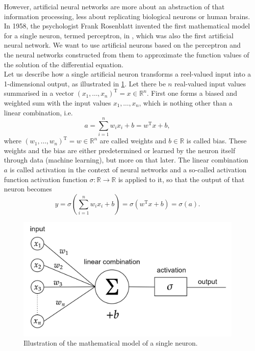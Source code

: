 However, artificial neural networks are more about an abstraction of that information processing, less about replicating biological neurons or human brains. In 1958, the psychologist Frank Rosenblatt invented the first mathematical model for a single neuron, termed perceptron, in \cite{Rosenblatt:1958}, which was also the first artificial neural network. We want to use artificial neurons based on the perceptron and the neural networks constructed from them to approximate the function values of the solution of the differential equation.  \\
Let us describe how a single artificial neuron transforms a reel-valued input into a 1-dimensional output, as illustrated in \cref{fig4}. Let there be $n$ real-valued input values summarised in a vector $(x_1, \ldots, x_n)^{\mathrm{T}} = x \in \mathbb{R}^n$. First one forms a biased and weighted sum with the input values $x_1, \ldots, x_n$, which is nothing other than a linear combination, i.e. 
\begin{equation*}
    a = \sum^{n}_{i=1} w_i x_i + b = w^{\mathrm{T}} x + b,
\end{equation*}
where $(w_1, \ldots, w_n)^{\mathrm{T}} = w \in \mathbb{R}^n$ are called weights and $b \in \mathbb{R}$ is called bias. These weights and the bias are either predetermined or learned by the neuron itself through data (machine learning), but more on that later. The linear combination $a$ is called activation in the context of neural networks and a so-called activation function activation function $\sigma \colon \mathbb{R} \to \mathbb{R}$ is applied to it, so that the output of that neuron becomes
\begin{equation*}
    y = \sigma \left( \sum^{n}_{i=1} w_i x_i + b \right) = \sigma \left( w^{\mathrm{T}} x + b \right) = \sigma(a).
\end{equation*}

\begin{figure}[H]
    \begin{center}
        \includegraphics[scale=0.3]{img/diagram-20220205_1.png}
    \end{center}
    \caption{Illustration of the mathematical model of a single neuron.}
    \label{fig4}
\end{figure}

